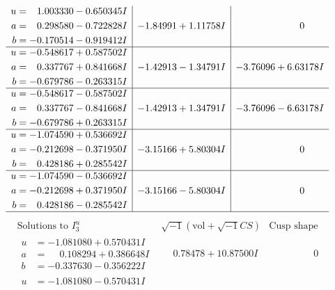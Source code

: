 \documentclass[1p]{elsarticle_modified}
\theoremstyle{definition}
\newcommand{\I}{\sqrt{-1}}
\begin{document}
$$\begin{array}{c|c|c}
\begin{aligned}
u &= \phantom{-}1.003330 - 0.650345 I \\
a &= \phantom{-}0.298580 - 0.722828 I \\
b &= -0.170514 - 0.919412 I\end{aligned}
 & -1.84991 + 1.11758 I & \phantom{-0.000000 } 0 \\ \hline\begin{aligned}
u &= -0.548617 + 0.587502 I \\
a &= \phantom{-}0.337767 + 0.841668 I \\
b &= -0.679786 - 0.263315 I\end{aligned}
 & -1.42913 - 1.34791 I & -3.76096 + 6.63178 I \\ \hline\begin{aligned}
u &= -0.548617 - 0.587502 I \\
a &= \phantom{-}0.337767 - 0.841668 I \\
b &= -0.679786 + 0.263315 I\end{aligned}
 & -1.42913 + 1.34791 I & -3.76096 - 6.63178 I \\ \hline\begin{aligned}
u &= -1.074590 + 0.536692 I \\
a &= -0.212698 - 0.371950 I \\
b &= \phantom{-}0.428186 + 0.285542 I\end{aligned}
 & -3.15166 + 5.80304 I & \phantom{-0.000000 } 0 \\ \hline\begin{aligned}
u &= -1.074590 - 0.536692 I \\
a &= -0.212698 + 0.371950 I \\
b &= \phantom{-}0.428186 - 0.285542 I\end{aligned}
 & -3.15166 - 5.80304 I & \phantom{-0.000000 } 0\\
 \hline 
 \end{array}$$\newpage$$\begin{array}{c|c|c}  
\text{Solutions to }I^u_{3}& \I (\text{vol} + \sqrt{-1}CS) & \text{Cusp shape}\\
 \hline 
\begin{aligned}
u &= -1.081080 + 0.570431 I \\
a &= \phantom{-}0.108294 + 0.386648 I \\
b &= -0.337630 - 0.356222 I\end{aligned}
 & \phantom{-}0.78478 + 10.87500 I & \phantom{-0.000000 } 0 \\ \hline\begin{aligned}
u &= -1.081080 - 0.570431 I \\

\end{aligned}
\end{array}$$
\end{document}
